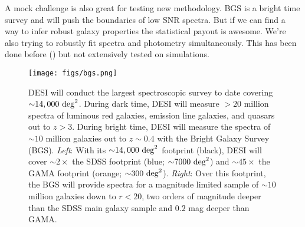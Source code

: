 A mock challenge is also great for testing new methodology.
BGS is a bright time survey and will push the boundaries of low SNR 
spectra. But if we can find a way to  infer robust galaxy properties the 
statistical payout is awesome.  
We're also trying to robustly fit spectra and photometry simultaneously. 
This has been done before () but not extensively tested 
on simulations. 


\begin{figure}
\begin{center}
\texttt{[image: figs/bgs.png]} 
\caption{DESI will conduct the largest spectroscopic survey to 
date covering ${\sim}14,000~{\rm deg}^2$. During dark time, DESI will measure
${>}20$ million spectra of luminous red galaxies, emission line galaxies, and 
quasars out to $z > 3$. During bright time, DESI will measure the spectra of 
${\sim}10$ million galaxies out to $z{\sim}0.4$  with the Bright Galaxy Survey (BGS).
{\em Left}: With its ${\sim}14,000~{\rm deg}^2$ footprint (black), DESI will 
cover ${\sim}2\times$ the SDSS footprint (blue; ${\sim}7000~{\rm deg}^2$) 
and ${\sim}45\times$ the GAMA footprint (orange; ${\sim}300~{\rm deg}^2$). 
{\em Right}: Over this footprint, the BGS will provide spectra for a magnitude 
limited sample of ${\sim}10$ million galaxies down to $r < 20$, two orders of 
magnitude deeper than the SDSS main galaxy sample and $0.2$ mag deeper than GAMA.}
\label{fig:bgs}
\end{center}
\end{figure}
